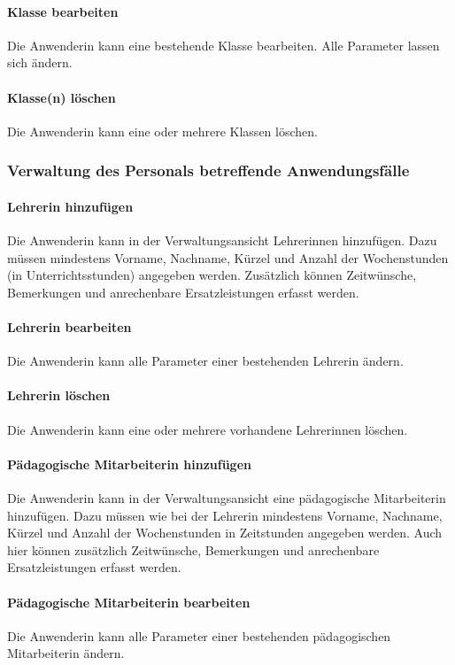 \documentclass[fontsize=12pt,paper=a4,twoside]{scrartcl}
\begin{document}
\paragraph{Klasse bearbeiten} Die Anwenderin kann eine bestehende Klasse bearbeiten. Alle Parameter lassen sich ändern.

\paragraph{Klasse(n) löschen} Die Anwenderin kann eine oder mehrere Klassen löschen.

\subsubsection{Verwaltung des Personals betreffende Anwendungsfälle}

\paragraph{Lehrerin hinzufügen}
Die Anwenderin kann in der Verwaltungsansicht Lehrerinnen hinzufügen. Dazu müssen mindestens Vorname, Nachname, Kürzel und Anzahl der Wochenstunden (in Unterrichtsstunden) angegeben werden. Zusätzlich können Zeitwünsche, Bemerkungen und anrechenbare Ersatzleistungen erfasst werden.

\paragraph{Lehrerin bearbeiten}
Die Anwenderin kann alle Parameter einer bestehenden Lehrerin ändern.

\paragraph{Lehrerin löschen}
Die Anwenderin kann eine oder mehrere vorhandene Lehrerinnen löschen.

\paragraph{Pädagogische Mitarbeiterin hinzufügen}
Die Anwenderin kann in der Verwaltungsansicht eine pädagogische Mitarbeiterin hinzufügen. Dazu müssen wie bei der Lehrerin mindestens Vorname, Nachname, Kürzel und Anzahl der Wochenstunden in Zeitstunden angegeben werden. Auch hier können zusätzlich Zeitwünsche, Bemerkungen und anrechenbare Ersatzleistungen erfasst werden.

\paragraph{Pädagogische Mitarbeiterin bearbeiten}
Die Anwenderin kann alle Parameter einer bestehenden pädagogischen Mitarbeiterin ändern.
\end{document}
